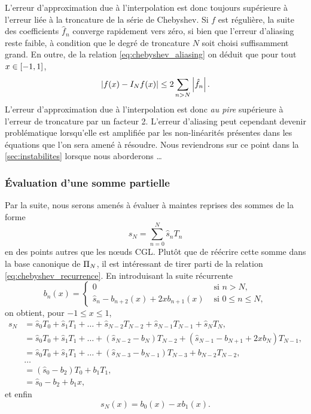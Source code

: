 L'erreur d'approximation due à l'interpolation est donc toujours supérieure à l'erreur liée à la troncature de la série de Chebyshev.
Si $f$ est régulière, la suite des coefficients $\hat{f}_n$ converge rapidement vers zéro, si bien que l'erreur d'aliasing reste faible, à condition que le degré de troncature $N$ soit choisi suffisamment grand.
En outre, de la relation \eqref{eq:chebyshev_aliasing} on déduit que pour tout $x \in \chebinterval$,
\begin{equation}
	\left| f(x) - \interpolant{f}{N}(x) \right| \leq 2 \sum_{n>N} \left| \hat{f}_n \right|.
\end{equation}
L'erreur d'approximation due à l'interpolation est donc \textit{au pire} supérieure à l'erreur de troncature par un facteur 2.
L'erreur d'aliasing peut cependant devenir problématique lorsqu'elle est amplifiée par les non-linéarités présentes dans les équations que l'on sera amené à résoudre. 
Nous reviendrons sur ce point dans la \autoref{sec:instabilites} lorsque nous aborderons \ldots




\subsubsection{Évaluation d'une somme partielle}
Par la suite, nous serons amenés à évaluer à maintes reprises des sommes de la forme
\begin{equation}
	s_N = \sum_{n=0}^N \hat{s}_n T_n
	\label{eq:chebyshev_sum}
\end{equation}
en des points autres que les n\oe uds CGL.
Plutôt que de réécrire cette somme dans la base canonique de $\polyspace{N}$, il est intéressant de tirer parti de la relation \eqref{eq:chebyshev_recurrence}. 
En introduisant la suite récurrente
\begin{equation}
	b_n(x) = 
	\begin{cases}
	 0 & \text{\ si\ } n > N,   \\ 
	 \hat{s}_n - b_{n+2}(x) + 2x b_{n+1}(x) & \text{\ si\ } 0 \leq n \leq N,
	\end{cases}
\end{equation}
on obtient, pour $-1 \leq x \leq 1$,%
\def\px{}%
\begin{align*}
	s_N\px 
	&= \hat{s}_0 T_0\px + \hat{s}_1 T_1\px + \ldots + \hat{s}_{N-2} T_{N-2}\px + \hat{s}_{N-1} T_{N-1}\px + \hat{s}_N T_N\px, \\
	&= \hat{s}_0 T_0 \px
	+ \hat{s}_1 T_1 \px
	+ \ldots 
	+ \left(\hat{s}_{N-2} - b_{N}\px\right) T_{N-2} \px
	+ \left(\hat{s}_{N-1} - b_{N+1}\px + 2x b_{N}\px \right) T_{N-1}\px, \\
	&= \hat{s}_0 T_0 \px
	+ \hat{s}_1 T_1 \px
	+ \ldots 
	+ \left(\hat{s}_{N-3} - b_{N-1}\px\right) T_{N-3} \px
	+ b_{N-2}\px T_{N-2}\px, \\
	& \ldots\\
	&= \left( \hat{s}_0 - b_2\px \right) T_0\px + b_1\px T_1\px, \\
	&= \hat{s}_0 - b_2\px + b_1\px x,
\end{align*}
et enfin
\begin{equation}
	s_N(x) = b_0(x) - x b_1(x).
\end{equation}

